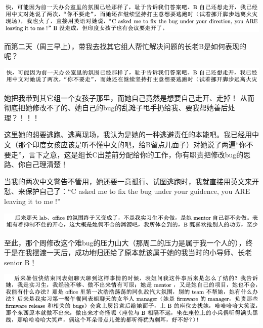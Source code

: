 \documentclass[9pt, b5paper]{article}
\begin{document}
\begin{center}
\includegraphics[width=.9\linewidth]{./pic/backups_plans_20210507_134018.png}
\end{center}

而第二天（周三早上），带我去找其它组人帮忙解决问题的长老B是如何表现的呢？

\begin{center}
\includegraphics[width=.9\linewidth]{./pic/backups_plans_20210507_134238.png}
\end{center}

她把我带到其它组一个女孩子那里，而她自己竟然是想要自己走开、走掉！ 从而彻底把她修改不了的、她自己的bug的乱滩子甩手扔给我、要我帮她善后处理？！！！

这里她的想要逃跑、逃离现场，我认为是她的一种逃避责任的本能吧。我已经用中文（那个印度女孩应该是听不懂中文的吧，给B留点儿面子）对她说了两遍“你不要走”，言下之意，这是组长C出差前分配给你的工作，你有职责把修改bug的思路、你自己理清楚！

当我的两次中文警告不管用，她还要一意孤行、试图逃跑时，我就直接用英文来开怼、来保护自己了：“C asked me to fix the bug under your guidence, you ARE leaving it to me !”

\begin{center}
\includegraphics[width=.9\linewidth]{./pic/backups_plans_20210507_152545.png}
\end{center}

至此，那个周修改这个难bug的压力山大（那周二的压力是属于我一个人的），终于是在我摆渡一天后，成功地归还给了原本就该属于她的我当时的小导师、长老senior B！

\begin{center}
\includegraphics[width=.9\linewidth]{./pic/readme_20210507_172159.png}
\end{center}
\end{document}
